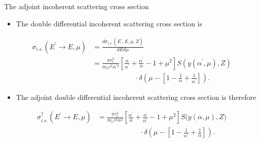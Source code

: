 \documentclass{beamer}
\begin{document}
\begin{frame}{The adjoint incoherent scattering cross section}

  \begin{itemize}
    \item The double differential incoherent scattering cross section is
  \end{itemize}
  \begin{align}
    \sigma_{i.s.}(E^{'} \to E, \mu) & = 
    \frac{d\sigma_{i.s.}(E^{'},E,\mu,Z)}{dEd\mu} \nonumber \\
    & =  \frac{\pi r_e^2}{m_ec^2 \alpha^{'2}}
    \left[\frac{\alpha}{\alpha^{'}} + \frac{\alpha^{'}}{\alpha} - 
      1 + \mu^2\right] S\left(y(\alpha^{'},\mu),Z\right) \nonumber \\
    & \qquad \qquad \qquad \cdot \delta\left(\mu - \left[1-\frac{1}{\alpha} + 
      \frac{1}{\alpha^{'}}\right]\right). \nonumber
  \end{align}

  \begin{itemize}
    \item The adjoint double differential incoherent scattering cross section
      is therefore
  \end{itemize}
   \begin{align}
    \sigma_{i.s.}^{\dagger}(E^{'} \to E, \mu)  & =  
    \frac{\pi r_e^2}{m_ec^2 \alpha^{2}}
    \left[\frac{\alpha^{'}}{\alpha} + \frac{\alpha}{\alpha^{'}} - 
      1 + \mu^2\right] S\Big(y(\alpha,\mu),Z\Big) \nonumber \\
    & \qquad \qquad \qquad \cdot \delta\left(\mu - \left[1-\frac{1}{\alpha^{'}} 
      + \frac{1}{\alpha}\right]\right). \nonumber
  \end{align}

\end{frame}
\end{document}
